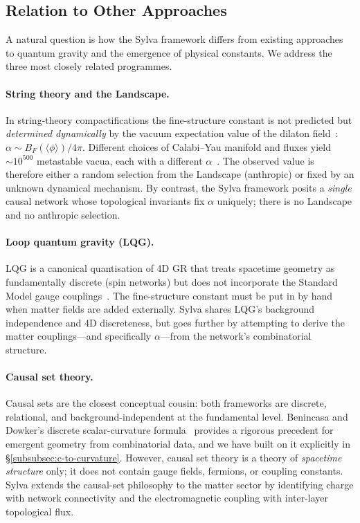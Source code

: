 \documentclass[11pt,a4paper]{article}
\theoremstyle{definition}
\theoremstyle{remark}
\begin{document}
\subsection{Relation to Other Approaches}\label{subsec:relation-to-others}

A natural question is how the Sylva framework differs from existing approaches to
quantum gravity and the emergence of physical constants.  We address the three
most closely related programmes.

\paragraph{String theory and the Landscape.}  In string-theory compactifications
the fine-structure constant is not predicted but \emph{determined dynamically} by
the vacuum expectation value of the dilaton field~\cite{Damour2002}:
$\alpha \sim B_{F}(\langle\phi\rangle)/4\pi$.  Different choices of Calabi--Yau
manifold and fluxes yield $\sim\!10^{500}$ metastable vacua, each with a different
$\alpha$~\cite{Susskind2003}.  The observed value is therefore either a random
selection from the Landscape (anthropic) or fixed by an unknown dynamical
mechanism.  By contrast, the Sylva framework posits a \emph{single} causal
network whose topological invariants fix $\alpha$ uniquely; there is no
Landscape and no anthropic selection.

\paragraph{Loop quantum gravity (LQG).}  LQG is a canonical quantisation of 4D
GR that treats spacetime geometry as fundamentally discrete (spin networks) but
does not incorporate the Standard Model gauge couplings~\cite{Rovelli2004}.  The
fine-structure constant must be put in by hand when matter fields are added
externally.  Sylva shares LQG's background independence and 4D discreteness, but
goes further by attempting to derive the matter couplings---and specifically
$\alpha$---from the network's combinatorial structure.

\paragraph{Causal set theory.}  Causal sets are the closest conceptual cousin:
both frameworks are discrete, relational, and background-independent at the
fundamental level.  Benincasa and Dowker's discrete scalar-curvature
formula~\cite{Benincasa2010} provides a rigorous precedent for emergent
geometry from combinatorial data, and we have built on it explicitly in
\S\ref{subsubsec:c-to-curvature}.  However, causal set theory is a theory of
\emph{spacetime structure} only; it does not contain gauge fields, fermions, or
coupling constants.  Sylva extends the causal-set philosophy to the matter
sector by identifying charge with network connectivity and the electromagnetic
coupling with inter-layer topological flux.
\end{document}
